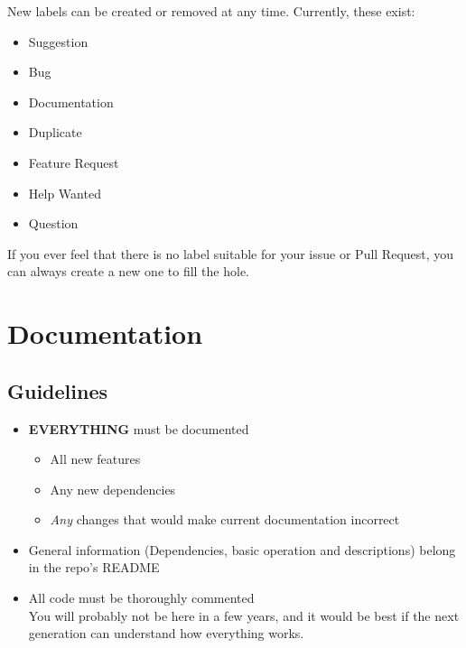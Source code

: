 \documentclass{article}
\begin{document}
\noindent
New labels can be created or removed at any time. Currently, these exist:
\begin{itemize}
	\item Suggestion
	\item Bug
	\item Documentation
	\item Duplicate
	\item Feature Request
	\item Help Wanted
	\item Question
\end{itemize}

\noindent
If you ever feel that there is no label suitable for your issue or Pull Request, you can always create a new one to fill the hole.

\pagebreak

\section{Documentation}

\subsection{Guidelines}

\begin{itemize}
	\item \textbf{EVERYTHING} must be documented
		\begin{itemize}
			\item All new features
			\item Any new dependencies
			\item \textit{Any} changes that would make current documentation incorrect
		\end{itemize}	
	\item General information (Dependencies, basic operation and descriptions) belong in the repo's README
	\item All code must be thoroughly commented
		\\You will probably not be here in a few years, and it would be best if the next generation can understand how everything works.
\end{itemize}
\end{document}
